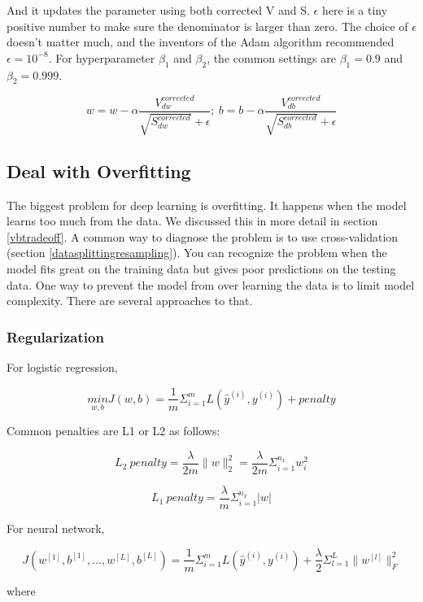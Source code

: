 \documentclass[12pt,]{krantz}
\begin{document}
And it updates the parameter using both corrected V and S. \(\epsilon\) here is a tiny positive number to make sure the denominator is larger than zero. The choice of \(\epsilon\) doesn't matter much, and the inventors of the Adam algorithm recommended \(\epsilon = 10^{-8}\). For hyperparameter \(\beta_1\) and \(\beta_2\), the common settings are \(\beta_1 = 0.9\) and \(\beta_2 = 0.999\).

\[w=w-\alpha \frac{V_{dw}^{corrected}}{\sqrt{S_{dw}^{corrected}} +\epsilon};\ b=b-\alpha\frac{V_{db}^{corrected}}{\sqrt{S_{db}^{corrected}}+\epsilon}\]

\hypertarget{deal-with-overfitting}{%
\subsection{Deal with Overfitting}\label{deal-with-overfitting}}

The biggest problem for deep learning is overfitting. It happens when the model learns too much from the data. We discussed this in more detail in section \ref{vbtradeoff}. A common way to diagnose the problem is to use cross-validation (section \ref{datasplittingresampling}). You can recognize the problem when the model fits great on the training data but gives poor predictions on the testing data. One way to prevent the model from over learning the data is to limit model complexity. There are several approaches to that.

\hypertarget{regularization}{%
\subsubsection{Regularization}\label{regularization}}

For logistic regression,

\[\underset{w,b}{min}J(w,b)= \frac{1}{m} \Sigma_{i=1}^{m}L(\hat{y}^{(i)}, y^{(i)}) + penalty\]

Common penalties are L1 or L2 as follows:

\[L_2\ penalty=\frac{\lambda}{2m}\parallel w \parallel_2^2 = \frac{\lambda}{2m}\Sigma_{i=1}^{n_x}w_i^2\]

\[L_1\ penalty = \frac{\lambda}{m}\Sigma_{i=1}^{n_x}|w|\]

For neural network,

\[J(w^{[1]},b^{[1]},\dots,w^{[L]},b^{[L]})=\frac{1}{m}\Sigma_{i=1}^{m}L(\hat{y}^{(i)},y^{(i)}) + \frac{\lambda}{2}\Sigma_{l=1}^{L} \parallel w^{[l]} \parallel^2_F\]

where
\end{document}
